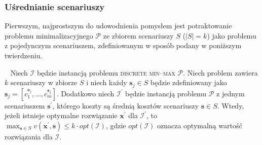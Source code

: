 \subsubsection{Uśrednianie scenariuszy}

Pierwszym, najprostszym do udowodnienia pomysłem jest potraktowanie problemu minimalizacyjnego $\mathcal{P}$ ze zbiorem scenariuszy $S$ ($\left| S \right| = k$) jako problemu z pojedynczym scenariuszem, zdefiniowanym w sposób podany w poniższym twierdzeniu.

\begin{theorem}\label{th:minmaxavg}~\cite[$430$]{minmaxSurvey}
	Niech $\mathcal{I}$ będzie instancją problemu \textsc{discrete min--max $\mathcal{P}$}. Niech problem zawiera $k$ scenariuszy w zbiorze $S$ i niech każdy $\textbf{s}_{j} \in S$ będzie zdefiniowany jako $\textbf{s}_{j} = \left[ c^{\textbf{s}_{j}}_{1}, \dots, c^{\textbf{s}_{j}}_{m} \right]$. Dodatkowo niech $\mathcal{I^{\prime}}$ będzie instancją problemu $\mathcal{P}$ z jednym scenariuszem $\textbf{s}^{\prime}$, którego koszty są średnią kosztów scenariuszy $\textbf{s} \in S$. Wtedy, jeżeli istnieje optymalne rozwiązanie $\textbf{x}^{\prime}$ dla $\mathcal{I}^{\prime}$, to $\max_{\textbf{s} \in S} v \left( \textbf{x}^{\prime}, \textbf{s} \right) \leqslant k \cdot opt \left( \mathcal{I} \right)$, gdzie $opt \left( \mathcal{I} \right)$ oznacza optymalną wartość rozwiązania dla $\mathcal{I}$.
\end{theorem}

